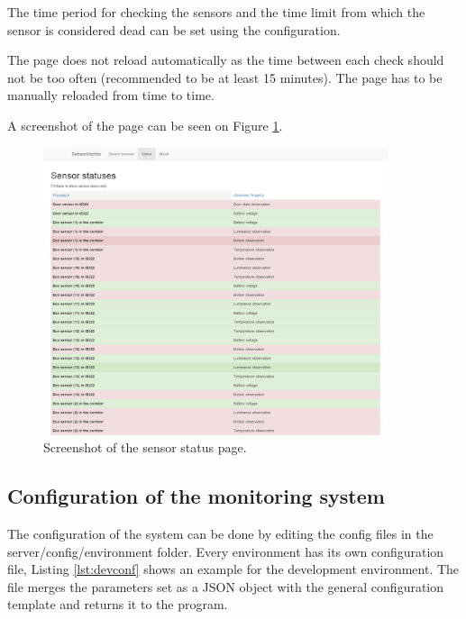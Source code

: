 The time period for checking the sensors and the time limit from which the sensor is considered dead can be set using the configuration. 

The page does not reload automatically as the time between each check should not be too often (recommended to be at least 15 minutes). The page has to be manually reloaded from time to time.

A screenshot of the page can be seen on Figure \ref{fig:shstat}.

\begin{figure}[h]
\centering
\includegraphics[width=0.9\textwidth]{figures/shstatus.png}
\caption{Screenshot of the sensor status page.\label{fig:shstat}}
\end{figure}


\subsection{Configuration of the monitoring system}
The configuration of the system can be done by editing the config files in the server/config/environment folder. Every environment has its own configuration file, Listing \ref{lst:devconf} shows an example for the development environment. The file merges the parameters set as a JSON object with the general configuration template and returns it to the program.


